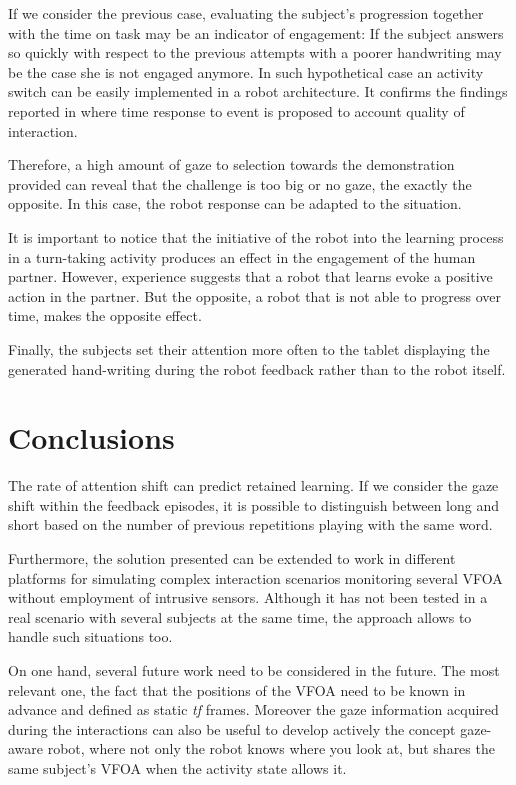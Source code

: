 \documentclass{sig-alternate}
\begin{document}
If we consider the previous case, evaluating the subject's progression together with the time on task may be an indicator of engagement: If the subject answers so quickly with respect to the previous attempts with a poorer handwriting may be the case she is not engaged anymore. In such hypothetical case an activity switch can be easily implemented in a robot architecture. It confirms the findings reported in \cite{anzalone} where time response to event is proposed to account quality of interaction. 

Therefore, a high amount of gaze to selection towards the demonstration provided can reveal that the challenge is too big or no gaze, the exactly the opposite. In this case, the robot response can be adapted to the situation. 

It is important to notice that the initiative of the robot into the learning process in a turn-taking activity produces an effect in the engagement of the human partner. However, experience suggests that a robot that learns evoke a positive action in the partner. But the opposite, a robot that is not able to progress over time, makes the opposite effect.

Finally, the subjects set their attention more often to the tablet displaying the generated hand-writing during the robot feedback rather than to the robot itself. 

\section{Conclusions}
The rate of attention shift can predict retained learning. If we consider the gaze shift within the feedback episodes, it is possible to distinguish between long and short based on the number of previous repetitions playing with the same word.

Furthermore, the solution presented can be extended to work in different platforms for simulating complex interaction scenarios monitoring several VFOA without employment of intrusive sensors. Although it has not been tested in a real scenario with several subjects at the same time, the approach allows to handle such situations too.

On one hand, several future work need to be considered in the future. The most relevant one, the fact that the positions of the VFOA need to be known in advance and defined as static \textit{tf} frames. Moreover the gaze information acquired during the interactions can also be useful to develop actively the concept gaze-aware robot, where not only the robot knows where you look at, but shares the same subject's VFOA when the activity state allows it. 
\end{document}
